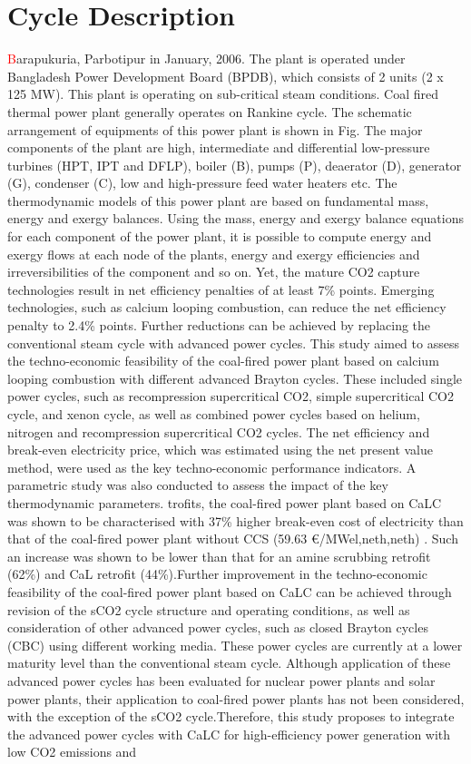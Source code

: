 \documentclass[11 pt]{article}
\begin{document}
\section{Cycle Description}
{\huge\textcolor{red}{\hspace{5 mm}B}}arapukuria, Parbotipur in January, 2006. The plant is operated under Bangladesh Power Development Board (BPDB), which consists of 2 units (2 x 125 MW). This plant is operating on sub-critical steam conditions. Coal fired thermal power plant generally operates on Rankine cycle. The schematic arrangement of equipments of this power plant is shown in Fig. 
The major components of the plant are high, intermediate and differential low-pressure turbines (HPT, IPT and DFLP), boiler (B), pumps (P), deaerator (D), generator (G), condenser (C), low and high-pressure feed water heaters etc. The thermodynamic models of this power plant are based on fundamental mass, energy and exergy balances. Using the mass, energy and exergy balance equations for each component of the power plant, it is possible to compute energy and exergy flows at each node of the plants, energy and exergy efficiencies and irreversibilities of the component and so on.  Yet, the mature CO2 capture technologies result in net efficiency penalties of at least 7\% points. Emerging technologies, such as calcium looping combustion, can reduce the net efficiency penalty to 2.4\% points. Further reductions can be achieved by replacing the conventional steam cycle with advanced power cycles. This study aimed to assess the techno-economic feasibility of the coal-fired power plant based on calcium looping combustion with different advanced Brayton cycles. These included single power cycles, such as recompression supercritical CO2, simple supercritical CO2 cycle, and xenon cycle, as well as combined power cycles based on helium, nitrogen and recompression supercritical CO2 cycles. The net efficiency and break-even electricity price, which was estimated using the net present value method, were used as the key techno-economic performance indicators. A parametric study was also conducted to assess the impact of the key thermodynamic parameters. trofits, the coal-fired power plant based on CaLC was shown to be characterised with 37\% higher break-even cost of electricity than that of the coal-fired power plant without CCS (59.63 €/MWel,neth,neth) . Such an increase was shown to be lower than that for an amine scrubbing retrofit (62\%) and CaL retrofit (44\%).Further improvement in the techno-economic feasibility of the coal-fired power plant based on CaLC can be achieved through revision of the sCO2 cycle structure and operating conditions, as well as consideration of other advanced power cycles, such as closed Brayton cycles (CBC) using different working media. These power cycles are currently at a lower maturity level than the conventional steam cycle. Although application of these advanced power cycles has been evaluated for nuclear power plants and solar power plants, their application to coal-fired power plants has not been considered, with the exception of the sCO2 cycle.Therefore, this study proposes to integrate the advanced power cycles with CaLC for high-efficiency power generation with low CO2 emissions and 
\end{document}
